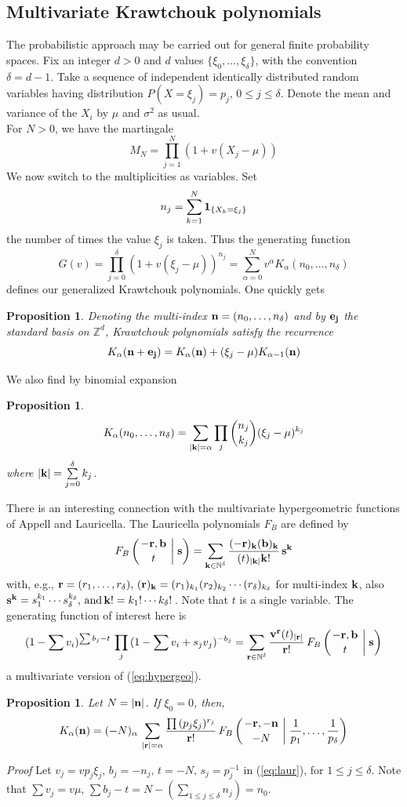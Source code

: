 \documentclass[12pt]{article}
\newtheorem{proposition}[theorem]{Proposition}
\def\?#1?{{\bf #1}}
\def\.#1.#2.{{#1^{#2}}}
\def\kck #1.#2.{ {#1\choose #2} }
\def\xjm{\xi_j-\mu}
\def\pl{polynomial}
\def\tfb #1.#2.#3.#4.{F_B\left({#1,#2\atop #3}\biggm| #4 \right)}
\def\qed{\qquad\framebox[7pt]\medskip\noindent}
\numberwithin{equation}{section}
\begin{document}
\subsection{Multivariate Krawtchouk polynomials}

The probabilistic approach may be carried out for general finite
probability spaces.
Fix an integer $d>0$ and $d$ values $\{\xi_0,\ldots,\xi_\delta\}$, with the convention $\delta=d-1$.
Take a sequence of independent identically distributed random variables having distribution
$P(X=\xi_j)=p_j,\,0\le j\le\delta$. Denote the mean and variance of the $X_i$ by $\mu$ and 
$\sigma^2$ as usual.\\
 
For $N>0$, we have the martingale
$$M_N=\prod_{j=1}^N (1+v(X_j-\mu))$$
We now switch to the multiplicities as variables. Set
$$n_j=\sum_{k=1}^N \?1?_{\{X_k=\xi_j\}}$$
the number of times the value $\xi_j$ is taken. Thus the generating function
$$G(v)=\prod_{j=0}^\delta(1+v(\xi_j-\mu))^{n_j}=\sum_{\alpha=0}^N
\.v.\alpha.K_{\alpha}(n_0,\ldots,n_\delta)$$
defines our generalized Krawtchouk \pl s. One quickly gets
 
\begin{proposition}Denoting the multi-index $\?n?=(n_0,\ldots,n_\delta)$
 and by $\?e_j?$ the standard basis on $\mathbb{Z}^d$, Krawtchouk \pl s satisfy the
recurrence
$$K_{\alpha}(\?n?+\?e_j?)=K_{\alpha}(\?n?)+(\xjm)K_{\alpha-1}(\?n?)$$
\end{proposition}
We also find by binomial expansion
\begin{proposition}
$$K_{\alpha}(n_0,\ldots,n_\delta)=\sum_{\vert\?k?\vert=\alpha}\prod_j\kck n_j.k_j.
           \.(\xjm).k_j.$$
where $\vert\?k?\vert=\sum\limits_{j=0}^\delta k_j$.
\end{proposition}
 
There is an interesting connection with the multivariate hypergeometric functions of Appell and Lauricella.
The Lauricella \pl s $F_B$ are defined by
$$\tfb-\?r?.\?b?.t.\?s?.=\sum_{\?k?\in\mathbb{N}^\delta}
{(-\?r?)_\?k?(\?b?)_\?k?\over (t)_{\vert\?k?\vert}\?k?!}\,\.\?s?.\?k?.
  $$
with, e.g., $\?r?=(r_1,\ldots,r_\delta),\,(\?r?)_{\?k?}=
 (r_1)_{k_1}(r_2)_{k_2}\cdots(r_\delta)_{k_{\delta}}$
  for multi-index $\?k?$,
also $\.\?s?.\?k?.=\.s_1.k_1.\cdots\.s_\delta.k_\delta.,\,{\rm and}\,
\?k?!=k_1!\cdots k_\delta!\,$. Note that $t$ is a single variable. The generating function
of interest here is
\begin{equation} \label{eq:laur}
\.(1-\sum v_i).\sum b_j-t.\,\prod_j\.(1-\sum v_i+s_jv_j).-b_j.
=\sum_{\?r?\in\mathbb{N}^\delta} {\.\?v?.\?r?.(t)_{\vert\?r?\vert}\over \?r?!}\,
 \tfb-\?r?.\?b?.t.\?s?.
\end{equation}
a multivariate version of (\ref{eq:hypergeo}).
\begin{proposition}{Let $N=|\?n?|$. If $\xi_0=0$, then, 
$$K_{\alpha}(\?n?)=(-N)_\alpha\,\sum_{\vert\?r?\vert=\alpha}{\prod\.(p_j\xi_j).r_j.
\over \?r?!}\,\tfb-\?r?.-\?n?.-N.{{1\over p_1},\ldots,{1\over p_\delta}}.
$$}
\end{proposition}
{\sl Proof } Let $v_j=vp_j\xi_j,\,b_j=-n_j,\,t=-N,\,s_j=p_j^{-1}$ in (\ref{eq:laur}),
for $1\le j\le\delta$. Note that $\sum v_j=v\mu$, $\sum b_j-t=
N-(\sum\limits_{1\le j\le \delta} n_j)=n_0$.\qed
\bigskip
 
\end{document}
